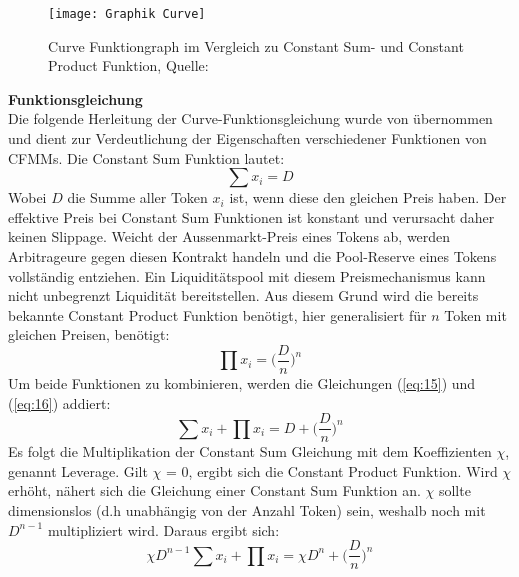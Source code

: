\documentclass[12pt,a4paper,titlepage,oneside,english]{article}
\begin{document}
\begin{figure}[h!]
\begin{center}
\texttt{[image: Graphik Curve]}
\caption{Curve Funktiongraph im Vergleich zu Constant Sum- und Constant Product Funktion, Quelle: \citet[S.3]{Egorov2019}}\label{fig:Curve}
\end{center}
\end{figure}

\textbf{Funktionsgleichung}\\
Die folgende Herleitung der Curve-Funktionsgleichung wurde von \citet[S.4f.]{Egorov2019} übernommen und dient zur Verdeutlichung der Eigenschaften verschiedener Funktionen von CFMMs.
Die Constant Sum Funktion lautet: 
\begin{equation}
\sum x_{i}= D \label{eq:15} 
\end{equation}
Wobei $D$ die Summe aller Token $x_{i}$ ist, wenn diese den gleichen Preis haben. %
Der effektive Preis bei Constant Sum Funktionen ist konstant und verursacht daher keinen Slippage. Weicht der Aussenmarkt-Preis eines Tokens %
ab, werden Arbitrageure gegen diesen Kontrakt handeln und die Pool-Reserve eines Tokens vollständig entziehen. Ein Liquiditätspool mit diesem Preismechanismus kann nicht unbegrenzt Liquidität bereitstellen.
Aus diesem Grund wird die bereits bekannte Constant Product Funktion benötigt, hier generalisiert für $n$ Token mit gleichen Preisen, benötigt:
\begin{equation}
\prod x_{i} = \biggl(\dfrac{D}{n}\biggr)^n \label{eq:16}
\end{equation}
Um beide Funktionen zu kombinieren, werden die Gleichungen (\ref{eq:15}) und (\ref{eq:16}) addiert:
\begin{equation}
\sum x_{i} + \prod x_{i} = D + \biggl(\dfrac{D}{n}\biggr)^n \label{eq:17}
\end{equation}
Es folgt die Multiplikation der Constant Sum Gleichung mit dem Koeffizienten $\chi$, genannt Leverage. Gilt $\chi$ = 0, ergibt sich die Constant Product Funktion. Wird $\chi$ erhöht, nähert sich die Gleichung einer Constant Sum Funktion an. $\chi$ sollte dimensionslos (d.h unabhängig von der Anzahl Token) sein, weshalb noch mit $D^{n-1}$ multipliziert wird. Daraus ergibt sich:
\begin{equation}
\chi D^{n-1}\sum x_{i} + \prod x_{i}=\chi D^n + \biggl(\dfrac{D}{n}\biggr)^n  \label{eq:18}
\end{equation}
\end{document}
